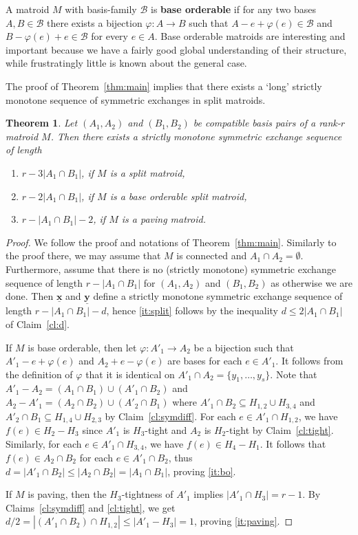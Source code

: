\documentclass[11pt,a4paper]{article}
\theoremstyle{plain}
\newtheorem{thm}{Theorem}
\theoremstyle{definition}
\newcommand{\cB}{\mathcal{B}}
\newcommand{\ul}[1]{\underline{\mathbf{#1}}}
\begin{document}
A matroid $M$ with basis-family $\cB$ is \textbf{base orderable} if for any two bases $A,B\in\cB$ there exists a bijection $\varphi\colon A\to B$ such that $A-e+\varphi(e)\in\cB$ and $B-\varphi(e)+e \in \cB$ for every $e\in A$. Base orderable matroids are interesting and important because we have a fairly good global understanding of their structure, while frustratingly little is known about the general case. 

The proof of Theorem~\ref{thm:main} implies that there exists a `long' strictly monotone sequence of symmetric exchanges in split matroids.  

\begin{thm} \label{thm:monotone} Let $(A_1, A_2)$ and $(B_1,B_2)$ be compatible basis pairs of a rank-$r$ matroid $M$. Then there exists a strictly monotone symmetric exchange sequence of length
\begin{enumerate}[label={(\alph*)}] \itemsep0em
    \item $r-3|A_1 \cap B_1|$, if $M$ is a split matroid, \label{it:split}
    \item $r-2|A_1 \cap B_1|$, if $M$ is a base orderable split matroid, \label{it:bo}
    \item $r-|A_1 \cap B_1|-2$, if $M$ is a paving matroid. \label{it:paving}
\end{enumerate}
\end{thm}
\begin{proof}
We follow the proof and notations of Theorem~\ref{thm:main}. Similarly to the proof there, we may assume that $M$ is connected and $A_1 \cap A_2 = \emptyset$. Furthermore, assume that there is no (strictly monotone) symmetric exchange sequence of length $r-|A_1 \cap B_1|$ for $(A_1,A_2)$ and $(B_1, B_2)$ as otherwise we are done. Then $\ul{x}$ and $\ul{y}$ define a strictly monotone symmetric exchange sequence of length $r-|A_1\cap B_1|-d$, hence \ref{it:split} follows by the inequality $d\le 2|A_1 \cap B_1|$ of Claim~\ref{cl:d}.  

If $M$ is base orderable, then let $\varphi\colon A'_1 \to A_2$ be a bijection such that $A'_1-e+\varphi(e)$ and $A_2+e-\varphi(e)$ are bases for each $e\in A'_1$. It follows from the definition of $\varphi$ that it is identical on $A'_1 \cap A_2 = \{y_1, \dots, y_s\}$. Note that $A'_1 - A_2 = (A_1 \cap B_1) \cup (A'_1 \cap B_2)$ and $A_2 - A'_1 = (A_2 \cap B_2) \cup (A'_2 \cap B_1)$ where $A'_1 \cap B_2 \subseteq H_{1,2} \cup H_{3,4}$ and $A'_2 \cap B_1 \subseteq H_{1,4} \cup H_{2,3}$ by Claim~\ref{cl:symdiff}. For each $e \in A'_1 \cap H_{1,2}$, we have $f(e) \in H_2-H_3$ since $A'_1$ is $H_3$-tight and $A_2$ is $H_2$-tight by Claim~\ref{cl:tight}. Similarly, for each $e \in A'_1 \cap H_{3,4}$, we have $f(e) \in H_4-H_1$. It follows that $f(e) \in A_2 \cap B_2$ for each $e \in A'_1 \cap B_2$, thus $d = |A'_1 \cap B_2| \le |A_2 \cap B_2| = |A_1 \cap B_1|$, proving \ref{it:bo}.

If $M$ is paving, then the $H_3$-tightness of $A'_1$ implies $|A'_1\cap H_3|=r-1$. By Claims~\ref{cl:symdiff} and \ref{cl:tight}, we get $d/2 = |(A'_1 \cap B_2) \cap H_{1,2}| \le |A'_1- H_3| = 1$, proving \ref{it:paving}.
\end{proof}
\end{document}
